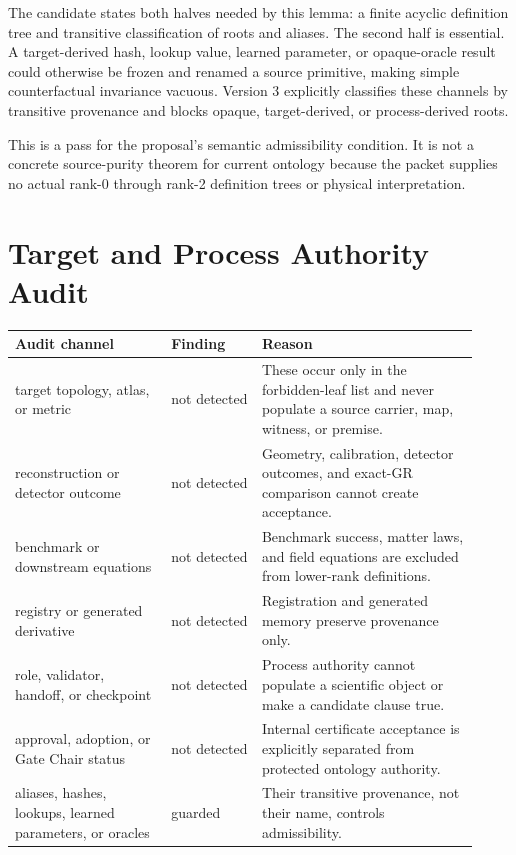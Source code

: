 \documentclass[11pt]{article}
\begin{document}
The candidate states both halves needed by this lemma: a finite acyclic
definition tree and transitive classification of roots and aliases. The
second half is essential. A target-derived hash, lookup value, learned
parameter, or opaque-oracle result could otherwise be frozen and renamed a
source primitive, making simple counterfactual invariance vacuous. Version 3
explicitly classifies these channels by transitive provenance and blocks
opaque, target-derived, or process-derived roots.

This is a pass for the proposal's semantic admissibility condition. It is not
a concrete source-purity theorem for current ontology because the packet
supplies no actual rank-0 through rank-2 definition trees or physical
interpretation.

\section{Target and Process Authority Audit}

\begin{longtable}{p{0.31\linewidth}p{0.18\linewidth}p{0.43\linewidth}}
\toprule
Audit channel & Finding & Reason \\
\midrule
target topology, atlas, or metric & not detected & These occur only in the forbidden-leaf list and never populate a source carrier, map, witness, or premise. \\
reconstruction or detector outcome & not detected & Geometry, calibration, detector outcomes, and exact-GR comparison cannot create acceptance. \\
benchmark or downstream equations & not detected & Benchmark success, matter laws, and field equations are excluded from lower-rank definitions. \\
registry or generated derivative & not detected & Registration and generated memory preserve provenance only. \\
role, validator, handoff, or checkpoint & not detected & Process authority cannot populate a scientific object or make a candidate clause true. \\
approval, adoption, or Gate Chair status & not detected & Internal certificate acceptance is explicitly separated from protected ontology authority. \\
aliases, hashes, lookups, learned parameters, or oracles & guarded & Their transitive provenance, not their name, controls admissibility. \\
\bottomrule
\end{longtable}
\end{document}
